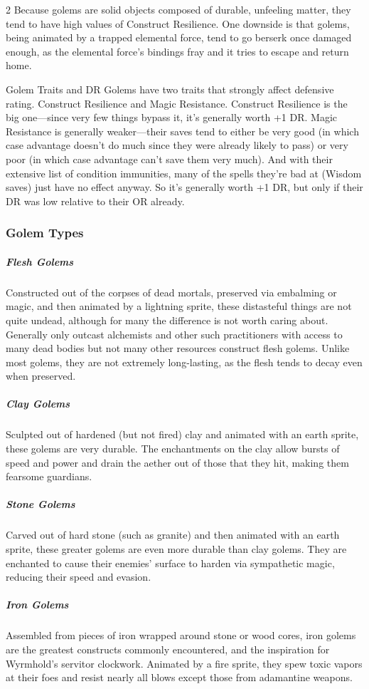 \begin{multicols}{2}
Because golems are solid objects composed of durable, unfeeling matter, they tend to have high values of Construct Resilience. One downside is that golems, being animated by a trapped elemental force, tend to go berserk once damaged enough, as the elemental force's bindings fray and it tries to escape and return home.

\begin{DndComment}{Golem Traits and DR}
	Golems have two traits that strongly affect defensive rating. Construct Resilience and Magic Resistance. Construct Resilience is the big one---since very few things bypass it, it's generally worth +1 DR. Magic Resistance is generally weaker---their saves tend to either be very good (in which case advantage doesn't do much since they were already likely to pass) or very poor (in which case advantage can't save them very much). And with their extensive list of condition immunities, many of the spells they're bad at (Wisdom saves) just have no effect anyway. So it's generally worth +1 DR, but only if their DR was low relative to their OR already.
\end{DndComment}

\subsubsection{Golem Types}
\subparagraph*{Flesh Golems} Constructed out of the corpses of dead mortals, preserved via embalming or magic, and then animated by a lightning sprite, these distasteful things are not quite undead, although for many the difference is not worth caring about. Generally only outcast alchemists and other such practitioners with access to many dead bodies but not many other resources construct flesh golems. Unlike most golems, they are not extremely long-lasting, as the flesh tends to decay even when preserved.
\subparagraph*{Clay Golems} Sculpted out of hardened (but not fired) clay and animated with an earth sprite, these golems are very durable. The enchantments on the clay allow bursts of speed and power and drain the aether out of those that they hit, making them fearsome guardians.
\subparagraph*{Stone Golems} Carved out of hard stone (such as granite) and then animated with an earth sprite, these greater golems are even more durable than clay golems. They are enchanted to cause their enemies' surface to harden via sympathetic magic, reducing their speed and evasion.
\subparagraph*{Iron Golems} Assembled from pieces of iron wrapped around stone or wood cores, iron golems are the greatest constructs commonly encountered, and the inspiration for Wyrmhold's servitor clockwork. Animated by a fire sprite, they spew toxic vapors at their foes and resist nearly all blows except those from adamantine weapons.
\end{multicols}
